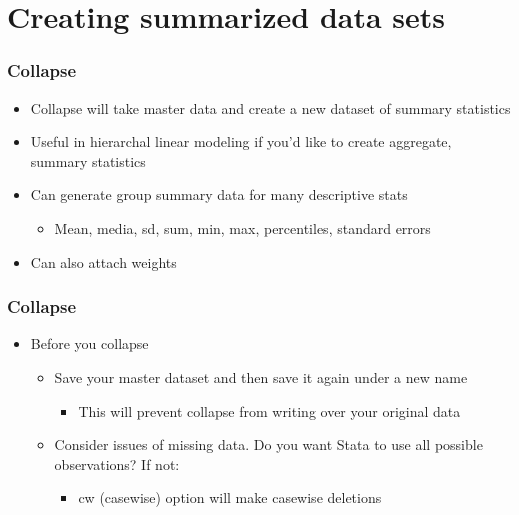 \documentclass[table]{beamer}
\begin{document}
\section{Creating summarized data sets}
\label{sec-7}
\begin{frame}
\frametitle{Collapse}
\label{sec-7-1}

\begin{itemize}
\item Collapse will take master data and create a new
  dataset of summary statistics
\item Useful in hierarchal linear modeling if you'd like
  to create aggregate, summary statistics
\item Can generate group summary data for many
  descriptive stats
\begin{itemize}
\item Mean, media, sd, sum, min, max, percentiles,
     standard errors
\end{itemize}
\item Can also attach weights
\end{itemize}
\end{frame}
\begin{frame}
\frametitle{Collapse}
\label{sec-7-2}

\begin{itemize}
\item Before you collapse
\begin{itemize}
\item Save your master dataset and then save it again
     under a new name
\begin{itemize}
\item This will prevent collapse from writing over your
        original data
\end{itemize}
\item Consider issues of missing data. Do you want
     Stata to use all possible observations? If not:
\begin{itemize}
\item cw (casewise) option will make casewise deletions
\end{itemize}
\end{itemize}
\end{itemize}
\end{frame}
\end{document}
